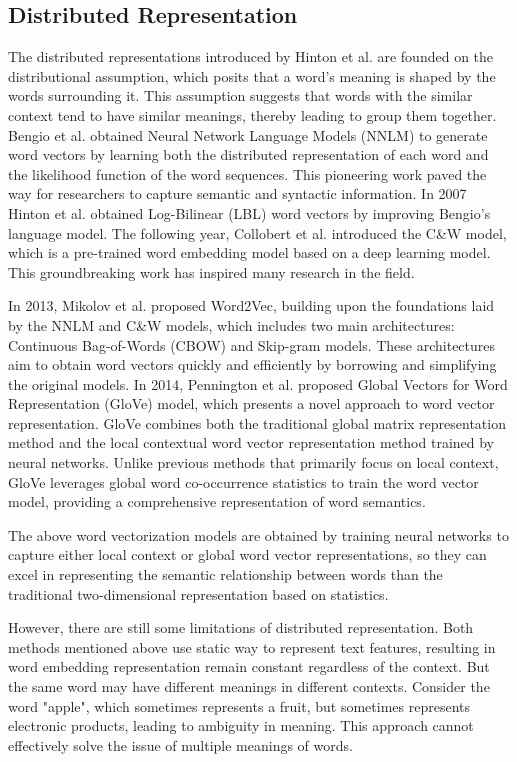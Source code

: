 \documentclass[ %
                    author={Bocheng Wang},
                supervisor={Dr. Qiang Liu},
                    degree={MSc},
                     title={A Research on Identification of Suicide Ideation in Texts with Multiple Models},
                      type={},
                      year={2024}]{dissertation}
\begin{document}
\subsection{Distributed Representation}
\noindent
The distributed representations introduced by Hinton et al.\cite{hinton1986learning} are founded on the distributional assumption, which posits that a word's meaning is shaped by the words surrounding it. This assumption suggests that words with the similar context tend to have similar meanings, thereby leading to group them together. Bengio et al. obtained Neural Network Language Models (NNLM) to generate word vectors by learning both the distributed representation of each word and the likelihood function of the word sequences.\cite{bengio2000neural} This pioneering work paved the way for researchers to capture semantic and syntactic information. In 2007 Hinton et al. obtained Log-Bilinear (LBL) word vectors by improving Bengio's language model.\cite{mnih2007three} The following year, Collobert et al. introduced the C\&W model\cite{collobert2008unified}, which is a pre-trained word embedding model based on a deep learning model. This groundbreaking work has inspired many research in the field.

In 2013, Mikolov et al. proposed Word2Vec\cite{mikolov2013efficient}, building upon the foundations laid by the NNLM and C\&W models, which includes two main architectures: Continuous Bag-of-Words (CBOW) and Skip-gram models. These architectures aim to obtain word vectors quickly and efficiently by borrowing and simplifying the original models. In 2014, Pennington et al. proposed Global Vectors for Word Representation (GloVe) model\cite{pennington2014glove}, which presents a novel approach to word vector representation. GloVe combines both the traditional global matrix representation method and the local contextual word vector representation method trained by neural networks. Unlike previous methods that primarily focus on local context, GloVe leverages global word co-occurrence statistics to train the word vector model, providing a comprehensive representation of word semantics.

The above word vectorization models are obtained by training neural networks to capture either local context or global word vector representations, so they can excel in representing the semantic relationship between words than the traditional two-dimensional representation based on statistics. 

However, there are still some limitations of distributed representation. Both methods mentioned above use static way to represent text features, resulting in word embedding representation remain constant regardless of the context. But the same word may have different meanings in different contexts. Consider the word "apple", which sometimes represents a fruit, but sometimes represents electronic products, leading to ambiguity in meaning. This approach cannot effectively solve the issue of multiple meanings of words.
\end{document}
